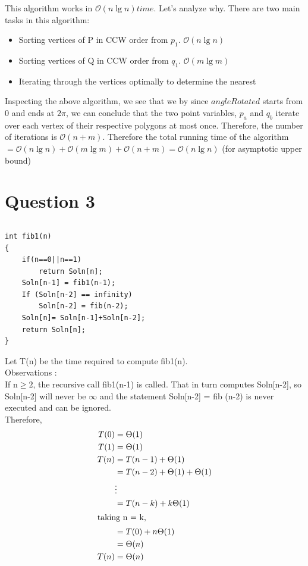 \documentclass{article}
\begin{document}
This algorithm works in $\mathcal{O}(n \lg n) time$. Let's analyze why. There are two main tasks in this algorithm:
\begin{itemize}
  \item Sorting vertices of P in CCW order from $p_1$. $\mathcal{O}(n \lg n)$
  \item Sorting vertices of Q in CCW order from $q_1$. $\mathcal{O}(m \lg m)$  
  \item Iterating through the vertices optimally to determine the nearest
\end{itemize}
Inspecting the above algorithm, we see that we by since $angleRotated$ starts from 0 and ends at $2\pi$, we can conclude that the two point variables, $p_a$ and $q_b$ iterate over each vertex of their respective polygons at most once. Therefore, the number of iterations is $\mathcal{O}(n+m)$.
\newline
Therefore the total running time of the algorithm $= \mathcal{O}(n \lg n) + \mathcal{O}(m \lg m) + \mathcal{O}(n+m) = \mathcal{O}(n \lg n)$ (for asymptotic upper bound)

\newpage
\section{Question 3}
\subsection{}
\begin{lstlisting}
int fib1(n)
{
	if(n==0||n==1) 
		return Soln[n];
	Soln[n-1] = fib1(n-1);
	If (Soln[n-2] == infinity) 
		Soln[n-2] = fib(n-2); 
	Soln[n]= Soln[n-1]+Soln[n-2];
	return Soln[n];
}
\end{lstlisting}

Let T(n) be the time required to compute fib1(n). \\
Observations : \\
If n$\geq 2$, the recursive call fib1(n-1) is called. That in turn computes Soln[n-2], so Soln[n-2] will never be $\infty$ and the statement Soln[n-2] = fib (n-2) is never executed and can be ignored.\\

Therefore, 
\begin{align*}
T(0) & = \Theta(1) \\
T(1) & = \Theta(1) \\
T(n) & = T(n-1) + \Theta(1) \\
& = T(n-2) + \Theta(1) + \Theta(1) \\
& \vdots \\
& = T(n-k) + k\Theta(1) \\
\intertext{taking n = k,}
& = T(0) + n\Theta(1) \\
& = \Theta(n) \\
T(n) & = \Theta(n)\\
\end{align*}
\end{document}

